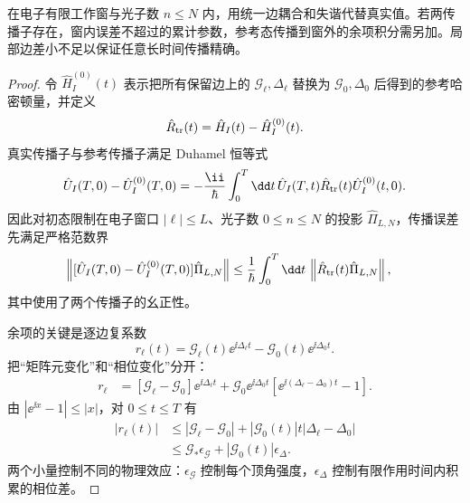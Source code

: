\begin{proposition}
在电子有限工作窗与光子数 $n\le N$ 内，用统一边耦合和失谐代替真实值。若两传播子存在，窗内误差不超过的累计参数，参考态传播到窗外的余项积分需另加。局部边差小不足以保证任意长时间传播精确。
\end{proposition}
\begin{proof}
令 $\hat H_I^{(0)}(t)$ 表示把所有保留边上的
$\mathcal G_\ell,\Delta_\ell$ 替换为 $\mathcal G_0,\Delta_0$ 后得到的参考哈密顿量，并定义
\[
 \hat R_{\rm tr}(t)=\hat H_I(t)-\hat H_I^{(0)}(t).
\]
真实传播子与参考传播子满足 Duhamel 恒等式
\begin{equation*}
 \hat U_I(T,0)-\hat U_I^{(0)}(T,0)
 =-\frac{\ii}{\hbar}\int_0^T\dd t\,
 \hat U_I(T,t)\hat R_{\rm tr}(t)\hat U_I^{(0)}(t,0).
\end{equation*}
因此对初态限制在电子窗口 $|\ell|\le L$、光子数 $0\le n\le N$ 的投影
$\hat\Pi_{L,N}$，传播误差先满足严格范数界
\begin{align*}
 \left\|
 [\hat U_I(T,0)-\hat U_I^{(0)}(T,0)]\hat\Pi_{L,N}
 \right\|
 &\le\frac1\hbar\int_0^T\dd t\,
 \left\|\hat R_{\rm tr}(t)\hat\Pi_{L,N}\right\|,
\end{align*}
其中使用了两个传播子的幺正性。

余项的关键是逐边复系数
\[
 r_\ell(t)
 =\mathcal G_\ell(t)\ee^{\ii\Delta_\ell t}
  -\mathcal G_0(t)\ee^{\ii\Delta_0t}.
\]
把“矩阵元变化”和“相位变化”分开：
\begin{align*}
 r_\ell
 &=[\mathcal G_\ell-\mathcal G_0]\ee^{\ii\Delta_\ell t}
 +\mathcal G_0\ee^{\ii\Delta_0t}
 \left[\ee^{\ii(\Delta_\ell-\Delta_0)t}-1\right].
\end{align*}
由 $|\ee^{\ii x}-1|\le |x|$，对 $0\le t\le T$ 有
\begin{align*}
 |r_\ell(t)|
 &\le |\mathcal G_\ell-\mathcal G_0|
 +|\mathcal G_0(t)|t|\Delta_\ell-\Delta_0|\\
 &\le \mathcal G_*\epsilon_{\mathcal G}
 +|\mathcal G_0(t)|\epsilon_\Delta.
\end{align*}
两个小量控制不同的物理效应：$\epsilon_{\mathcal G}$ 控制每个顶角强度，$\epsilon_\Delta$ 控制有限作用时间内积累的相位差。


\end{proof}
